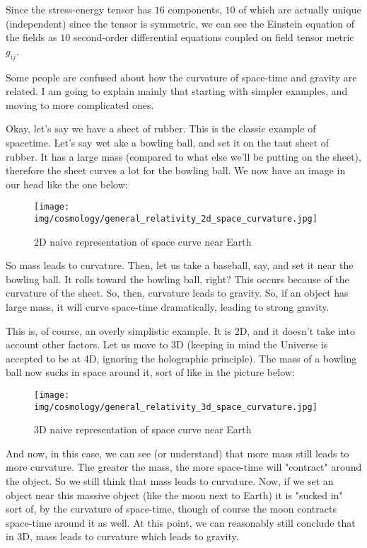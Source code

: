 	Since the stress-energy tensor has $16$ components, $10$ of which are actually unique (independent) since the tensor is symmetric, we can see the Einstein equation of the fields as $10$ second-order differential equations coupled on field tensor metric $g_{ij}$.
	
	Some people are confused about how the curvature of space-time and gravity are related. I am going to explain mainly that starting with simpler examples, and moving to more complicated ones.

	Okay, let's say we have a sheet of rubber. This is the classic example of spacetime. Let's say wet ake a bowling ball, and set it on the taut sheet of rubber. It has a large mass (compared to what else we'll be putting on the sheet), therefore the sheet curves a lot for the bowling ball. We now have an image in our head like the one below:
	\begin{figure}[H]
		\centering
		\texttt{[image: img/cosmology/general\_relativity\_2d\_space\_curvature.jpg]}	
		\caption{2D naive representation of space curve near Earth}
	\end{figure}
	So mass leads to curvature. Then, let us take a baseball, say, and set it near the bowling ball. It rolls toward the bowling ball, right? This occurs because of the curvature of the sheet. So, then, curvature leads to gravity. So, if an object has large mass, it will curve space-time dramatically, leading to strong gravity.

	This is, of course, an overly simplistic example. It is 2D, and it doesn't take into account other factors. Let us move to 3D (keeping in mind the Universe is accepted to be at 4D, ignoring the holographic principle). The mass of a bowling ball now sucks in space around it, sort of like in the picture below:
	\begin{figure}[H]
		\centering
		\texttt{[image: img/cosmology/general\_relativity\_3d\_space\_curvature.jpg]}	
		\caption{3D naive representation of space curve near Earth}
	\end{figure}
	And now, in this case, we can see (or understand) that more mass still leads to more curvature. The greater the mass, the more space-time will "contract" around the object. So we still think that mass leads to curvature. Now, if we set an object near this massive object (like the moon next to Earth) it is "sucked in" sort of, by the curvature of space-time, though of course the moon contracts space-time around it as well. At this point, we can reasonably still conclude that in 3D, mass leads to curvature which leads to gravity.
	

